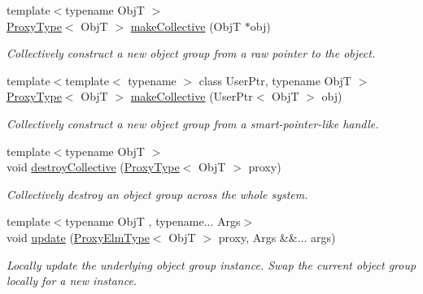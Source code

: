 \begin{DoxyCompactItemize}
{\footnotesize template$<$typename ObjT $>$ }\\\hyperlink{structvt_1_1objgroup_1_1_obj_group_manager_aea65eef52f240a52210132eef5ce591f}{Proxy\+Type}$<$ ObjT $>$ \hyperlink{structvt_1_1objgroup_1_1_obj_group_manager_a08fdc6029708edf1e3f7a4a66c998b99}{make\+Collective} (ObjT $\ast$obj)
\begin{DoxyCompactList}\small\item\em Collectively construct a new object group from a raw pointer to the object. \end{DoxyCompactList}\item 
{\footnotesize template$<$template$<$ typename $>$ class User\+Ptr, typename ObjT $>$ }\\\hyperlink{structvt_1_1objgroup_1_1_obj_group_manager_aea65eef52f240a52210132eef5ce591f}{Proxy\+Type}$<$ ObjT $>$ \hyperlink{structvt_1_1objgroup_1_1_obj_group_manager_affb52495aa20a14b485ad3ba48234718}{make\+Collective} (User\+Ptr$<$ ObjT $>$ obj)
\begin{DoxyCompactList}\small\item\em Collectively construct a new object group from a smart-\/pointer-\/like handle. \end{DoxyCompactList}\item 
{\footnotesize template$<$typename ObjT $>$ }\\void \hyperlink{structvt_1_1objgroup_1_1_obj_group_manager_ad02bff10088a4f8e453cf24bd832308c}{destroy\+Collective} (\hyperlink{structvt_1_1objgroup_1_1_obj_group_manager_aea65eef52f240a52210132eef5ce591f}{Proxy\+Type}$<$ ObjT $>$ proxy)
\begin{DoxyCompactList}\small\item\em Collectively destroy an object group across the whole system. \end{DoxyCompactList}\item 
{\footnotesize template$<$typename ObjT , typename... Args$>$ }\\void \hyperlink{structvt_1_1objgroup_1_1_obj_group_manager_abd0f61b0578a268a27420f2c38e3b12d}{update} (\hyperlink{structvt_1_1objgroup_1_1_obj_group_manager_adba6c8ecb0f4c30e719f1abb995cfc9b}{Proxy\+Elm\+Type}$<$ ObjT $>$ proxy, Args \&\&... args)
\begin{DoxyCompactList}\small\item\em Locally update the underlying object group instance. Swap the current object group locally for a new instance. \end{DoxyCompactList}\item 

\end{DoxyCompactItemize}
